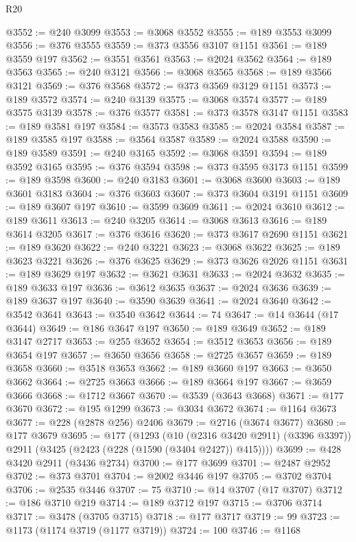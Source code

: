 \begin{lexlean}{R20}
\begin{coremodule}
@3552 := @240 @3099
@3553 := @3068 @3552
@3555 := @189 @3553 @3099
@3556 := @376 @3555
@3559 := @373 @3556 @3107 @1151
@3561 := @189 @3559 @197
@3562 := @3551 @3561
@3563 := @2024 @3562
@3564 := @189 @3563
@3565 := @240 @3121
@3566 := @3068 @3565
@3568 := @189 @3566 @3121
@3569 := @376 @3568
@3572 := @373 @3569 @3129 @1151
@3573 := @189 @3572
@3574 := @240 @3139
@3575 := @3068 @3574
@3577 := @189 @3575 @3139
@3578 := @376 @3577
@3581 := @373 @3578 @3147 @1151
@3583 := @189 @3581 @197
@3584 := @3573 @3583
@3585 := @2024 @3584
@3587 := @189 @3585 @197
@3588 := @3564 @3587
@3589 := @2024 @3588
@3590 := @189 @3589
@3591 := @240 @3165
@3592 := @3068 @3591
@3594 := @189 @3592 @3165
@3595 := @376 @3594
@3598 := @373 @3595 @3173 @1151
@3599 := @189 @3598
@3600 := @240 @3183
@3601 := @3068 @3600
@3603 := @189 @3601 @3183
@3604 := @376 @3603
@3607 := @373 @3604 @3191 @1151
@3609 := @189 @3607 @197
@3610 := @3599 @3609
@3611 := @2024 @3610
@3612 := @189 @3611
@3613 := @240 @3205
@3614 := @3068 @3613
@3616 := @189 @3614 @3205
@3617 := @376 @3616
@3620 := @373 @3617 @2690 @1151
@3621 := @189 @3620
@3622 := @240 @3221
@3623 := @3068 @3622
@3625 := @189 @3623 @3221
@3626 := @376 @3625
@3629 := @373 @3626 @2026 @1151
@3631 := @189 @3629 @197
@3632 := @3621 @3631
@3633 := @2024 @3632
@3635 := @189 @3633 @197
@3636 := @3612 @3635
@3637 := @2024 @3636
@3639 := @189 @3637 @197
@3640 := @3590 @3639
@3641 := @2024 @3640
@3642 := @3542 @3641
@3643 := @3540 @3642
@3644 := 74
@3647 := @14 @3644 (@17 @3644)
@3649 := @186 @3647 @197
@3650 := @189 @3649
@3652 := @189 @3147 @2717
@3653 := @255 @3652
@3654 := @3512 @3653
@3656 := @189 @3654 @197
@3657 := @3650 @3656
@3658 := @2725 @3657
@3659 := @189 @3658
@3660 := @3518 @3653
@3662 := @189 @3660 @197
@3663 := @3650 @3662
@3664 := @2725 @3663
@3666 := @189 @3664 @197
@3667 := @3659 @3666
@3668 := @1712 @3667
@3670 := @3539 (@3643 @3668)
@3671 := @177 @3670
@3672 := @195 @1299
@3673 := @3034 @3672
@3674 := @1164 @3673
@3677 := @228 (@2878 @256) @2406
@3679 := @2716 (@3674 @3677)
@3680 := @177 @3679
@3695 := @177
    (@1293
      (@10 (@2316 @3420 @2911) (@3396 @3397))
      @2911
      (@3425 (@2423 (@228 (@1590 (@3404 @2427)) @415))))
@3699 := @428 @3420 @2911 (@3436 @2734)
@3700 := @177 @3699
@3701 := @2487 @2952
@3702 := @373 @3701
@3704 := @2002 @3446 @197
@3705 := @3702 @3704
@3706 := @2535 @3446
@3707 := 75
@3710 := @14 @3707 (@17 @3707)
@3712 := @186 @3710 @219
@3714 := @189 @3712 @197
@3715 := @3706 @3714
@3717 := @3478 (@3705 @3715)
@3718 := @177 @3717
@3719 := 99
@3723 := @1173 (@1174 @3719 (@1177 @3719))
@3724 := 100
@3746 := @1168

\end{coremodule}
\end{lexlean}

